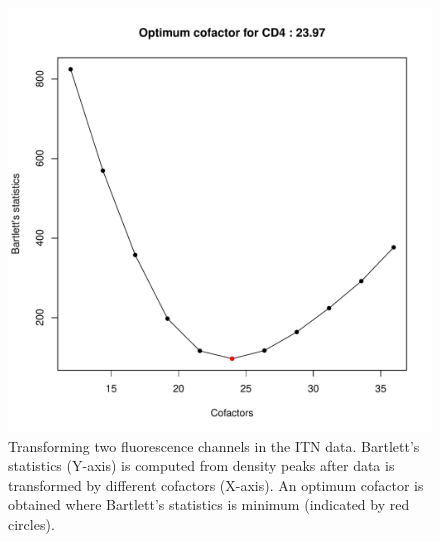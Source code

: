 \documentclass{article}\usepackage[]{graphicx}\usepackage[]{color}
\newenvironment{knitrout}{}{} %
\begin{document}
\begin{knitrout}
\begin{figure}
\includegraphics[width=.49\linewidth]{figure/ITN-2} \caption[Transforming two fluorescence channels in the ITN data]{Transforming two fluorescence channels in the ITN data. Bartlett's statistics (Y-axis) is computed from density peaks after data is transformed by different cofactors (X-axis). An optimum cofactor is obtained where Bartlett's statistics is minimum (indicated by red circles).}\label{fig:ITN}
\end{figure}


\end{knitrout}
\end{document}
